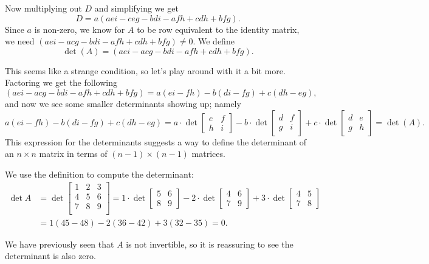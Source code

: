 \documentclass[12pt,letterpaper]{article}
\begin{document}
\begin{enumerate}
Now multiplying out $D$ and simplifying we get 
$$D=a(aei-ceg-bdi -afh+cdh+bfg).$$ Since $a$ is non-zero, we know for $A$ to be row equivalent to the identity matrix, we need $(aei-acg-bdi -afh+cdh+bfg)\neq0$. We define $$\det(A)=(aei-acg-bdi -afh+cdh+bfg).$$ 

This seems like a strange condition, so let's play around with it a bit more. Factoring we get the following $$(aei-acg-bdi -afh+cdh+bfg)= a(ei-fh)-b(di-fg)+c(dh-eg),$$ and now we see some smaller determinants showing up; namely $$a(ei-fh)-b(di-fg)+c(dh-eg)= a \cdot \det \begin{bmatrix} e & f\\ h & i \end{bmatrix} -b\cdot \det \begin{bmatrix} d & f\\ g & i \end{bmatrix}+c\cdot \det \begin{bmatrix} d & e\\ g & h \end{bmatrix}=\det(A).$$ This expression for the determinants suggests a way to define the determinant of an $n\times n$ matrix in terms of $(n-1)\times(n-1)$ matrices.
  
  \Answer We use the definition to compute the determinant:
  \begin{align*}
 \det A&=\det \begin{bmatrix}
  1 & 2 &3\\
  4 & 5 &6\\
  7 & 8 & 9\\
  \end{bmatrix}=1 \cdot \det \begin{bmatrix} 5 & 6\\ 8 & 9 \end{bmatrix}-2 \cdot \det \begin{bmatrix} 4 & 6\\ 7 & 9 \end{bmatrix}+3 \cdot \det \begin{bmatrix} 4 & 5\\ 7 & 8 \end{bmatrix}\\&=1(45-48)-2(36-42)+3(32-35)=0.
\end{align*}

We have previously seen that $A$ is not invertible, so it is reassuring to see the determinant is also zero.
    

\end{enumerate}
\end{document}
